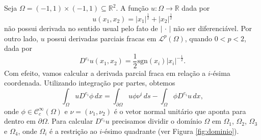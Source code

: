 \documentclass[a4paper, 11pt]{book}
\theoremstyle{definition}
\newcommand{\bR}{\mathbb{R}}
\newcommand{\cC}{\mathcal{C}}
\newcommand{\cL}{\mathcal{L}}
\newcommand{\sgn}{\mathrm{sgn}}
\begin{document}
\begin{ex}
    Seja $\Omega = (-1,1) \times (-1,1) \subseteq \bR^2$. A função $u : \Omega \to \bR$ dada por
    \[
        u(x_1,x_2) = |x_1|^{\frac{1}{2}} + |x_2|^{\frac{1}{2}}
    \]
    não possui derivada no sentido usual pelo fato de $|\,\cdot\,|$ não ser diferenciável.
    Por outro lado, $u$ possui derivadas parciais fracas em $\cL^p(\Omega)$, quando $0 < p < 2$, dada por
    \[
        D^{e_i}u(x_1,x_2) = \frac{1}{2}\sgn(x_i) |x_i|^{-\frac{1}{2}}.
    \]
    Com efeito, vamos calcular a derivada parcial fraca em relação a $i$-ésima coordenada. Utilizando integração por partes, obtemos
    \begin{equation} \label{eq:derivada-fraca-exemplo-legal}
        \int_\Omega u D^{e_i} \phi \,dx = \int_{\partial\Omega} u \phi \nu^i \,ds - \int_\Omega \phi D^{e_i}u \,dx,
    \end{equation}
    onde $\phi \in \cC^\infty_c(\Omega)$ e $\nu = (\nu_1, \nu_2)$ é o vetor normal unitário que aponta para dentro em $\partial \Omega$.
    Para calcular $D^{e_i} u$ precisamos dividir o domínio $\Omega$ em $\Omega_1$, $\Omega_2$, $\Omega_3$ e $\Omega_4$, onde $\Omega_i$ é a restrição ao $i$-ésimo quadrante (ver Figura \ref{fig:dominio}).
    \begin{figure}[H]
        \centering
\end{figure}
\end{ex}
\end{document}
